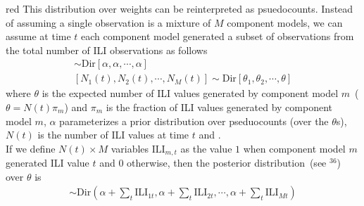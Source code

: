 \documentclass[
  fontsize=11pt,
  paper=a4,
  parskip=half,
  enlargefirstpage=on,    %
  fromalign=right,        %
  fromphone=on,           %
  fromrule=aftername,     %
  addrfield=on,           %
  backaddress=on,         %
  subject=beforeopening,  %
  locfield=narrow,        %
  foldmarks=on,           %
]{scrlttr2}
\def\l{\left}
\def\r{\right}
\begin{document}
\begin{commt}{red}
This distribution over weights can be reinterpreted as psuedocounts.
Instead of assuming a single observation is a mixture of $M$ component models, we can assume at time $t$ each component model generated a subset of observations from the total number of ILI observations as follows 
\begin{align}
  [\theta_{1},\theta_{2},\cdots,\theta_{M}] \sim \text{Dir}\l[ \alpha, \alpha, \cdots, \alpha \r] \tag{19}\label{eq:19} \\
  [N_{1}(t),N_{2}(t),\cdots,N_{M}(t) ]  \sim \text{Dir} \l[ \theta_{1}, \theta_{2}, \cdots, \theta \r] \tag{20}\label{eq:20}
\end{align}
where $\theta$ is the expected number of ILI values generated by component model $m$~( $\theta = N(t) \pi_{m}$) and $\pi_{m}$ is the fraction of ILI values generated by component model $m$, $\alpha$ parameterizes a prior distribution over pseduocounts (over the $\theta$s),  $N(t)$ is the number of ILI values at time $t$ and .\\

If we define $N(t) \times M$ variables $\text{ILI}_{m,t}$ as the value $1$ when component model $m$ generated ILI value $t$ and 0 otherwise, then the posterior distribution~(see $^{36}$) over $\theta$ is
\begin{align}
  [\theta_{1},\theta_{2},\cdots,\theta_{M}] \sim \text{Dir}\l( \alpha + \sum_{t} \text{ILI}_{1t}, \alpha + \sum_{t} \text{ILI}_{2t}, \cdots, \alpha + \sum_{t} \text{ILI}_{Mt}\r) \label{pcounts} \tag{21}
\end{align}
\end{commt}
\end{document}
